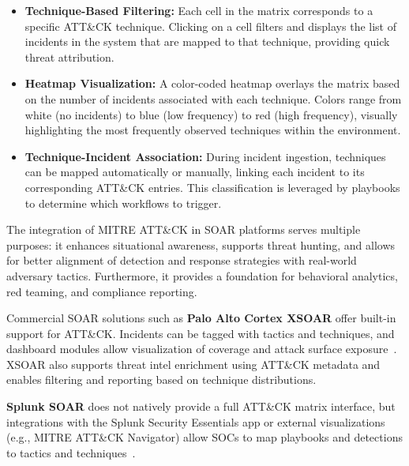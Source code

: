 \begin{itemize}
    \item \textbf{Technique-Based Filtering:} Each cell in the matrix corresponds to a specific ATT\&CK technique. Clicking on a cell filters and displays the list of incidents in the system that are mapped to that technique, providing quick threat attribution.
    
    \item \textbf{Heatmap Visualization:} A color-coded heatmap overlays the matrix based on the number of incidents associated with each technique. Colors range from white (no incidents) to blue (low frequency) to red (high frequency), visually highlighting the most frequently observed techniques within the environment.
    
    \item \textbf{Technique-Incident Association:} During incident ingestion, techniques can be mapped automatically or manually, linking each incident to its corresponding ATT\&CK entries. This classification is leveraged by playbooks to determine which workflows to trigger.
\end{itemize}

The integration of MITRE ATT\&CK in SOAR platforms serves multiple purposes: it enhances situational awareness, supports threat hunting, and allows for better alignment of detection and response strategies with real-world adversary tactics. Furthermore, it provides a foundation for behavioral analytics, red teaming, and compliance reporting.

Commercial SOAR solutions such as \textbf{Palo Alto Cortex XSOAR} offer built-in support for ATT\&CK. Incidents can be tagged with tactics and techniques, and dashboard modules allow visualization of coverage and attack surface exposure~\cite{paloalto}. XSOAR also supports threat intel enrichment using ATT\&CK metadata and enables filtering and reporting based on technique distributions.

\textbf{Splunk SOAR} does not natively provide a full ATT\&CK matrix interface, but integrations with the Splunk Security Essentials app or external visualizations (e.g., MITRE ATT\&CK Navigator) allow SOCs to map playbooks and detections to tactics and techniques~\cite{splunk}.

